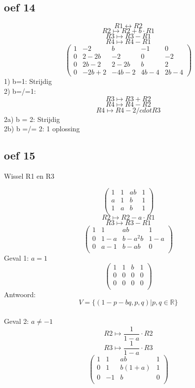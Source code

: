 \documentclass[10pt,a4paper]{article}
\begin{document}
\subsection*{oef 14}
\[R1 \leftrightarrow R2 \]
\[R2 \longmapsto R2 + b\cdot R1\]
\[R3 \longmapsto R3 - R1\]
\[R4 \longmapsto R4 - R1\]
\[
\begin{pmatrix}
1 &  -2 &  b & -1 & 0\\
0 &  2-2b &  -2 & 0 & -2\\
0 & 2b-2 & 2-2b & b & 2\\
0 & -2b+2 & -4b-2 & 4b-4 & 2b-4
\end{pmatrix}
\]
1) b=1: Strijdig 
\[\]
2) b=/=1:
\[R3 \longmapsto R3 + R2\]
\[R4 \longmapsto R4 - R2\]
\[R4 \longmapsto R4 -2/cdot R3\]
2a) b = 2: Strijdig
\[\]
2b) b =/= 2: 1 oplossing

\subsection*{oef 15}
\begin{center}
Wissel R1 en R3
\end{center}
\[
\begin{pmatrix}
1 & 1 & ab & 1\\
a & 1 & b & 1\\
1 & a & b & 1\\
\end{pmatrix}
\]
\[ R2 \longmapsto R2 - a\cdot R1 \]
\[ R3 \longmapsto R3 - R1 \]
\[
\begin{pmatrix}
1 & 1 & ab & 1\\
0 & 1-a & b-a^2b & 1-a\\
0 & a-1 & b-ab & 0\\
\end{pmatrix}
\]
Geval 1: $a=1$
\[
\begin{pmatrix}
1 & 1 & b & 1\\
0 & 0 & 0 & 0\\
0 & 0 & 0 & 0\\
\end{pmatrix}
\]
Antwoord:
\[
V = \{ (1-p-bq,p,q) | p,q \in \mathbb{R} \}
\]\\
Geval 2: $a \neq -1$
\[ R2 \longmapsto \frac{1}{1-a}\cdot R2 \]
\[ R3 \longmapsto \frac{1}{1-a}\cdot R3 \]
\[
\begin{pmatrix}
1 & 1 & ab & 1\\
0 & 1 & b(1+a) & 1\\
0 & -1 & b & 0\\
\end{pmatrix}
\]
\end{document}
